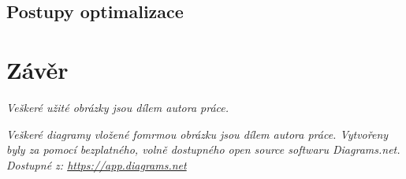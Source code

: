 \documentclass[12pt, a4paper,
 oneside,   
 openright
]{report}
\begin{document}
\section{Postupy optimalizace}



\newpage

\chapter{Závěr}




\listoffigures

\vspace{0.5cm}
\textit{Veškeré užité obrázky jsou dílem autora práce.} \vspace{0.5cm}

\textit{Veškeré diagramy vložené fomrmou obrázku jsou dílem autora práce. Vytvořeny byly za pomocí bezplatného, volně dostupného open source softwaru Diagrams.net. Dostupné z: \url{https://app.diagrams.net}} \hangindent=0.7cm




% 
\end{document}
